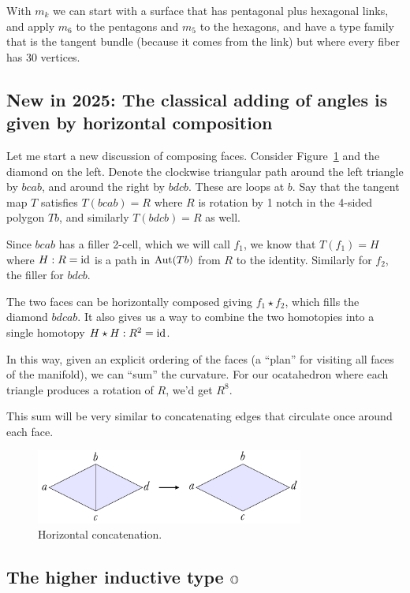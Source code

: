 With \( m_k \) we can start with a surface that has pentagonal plus hexagonal links, and apply \( m_6 \) to the pentagons and \( m_5 \) to the hexagons, and have a type family that is the tangent bundle (because it comes from the link) but where every fiber has 30 vertices.

\subsection{New in 2025: The classical adding of angles is given by horizontal composition}
Let me start a new discussion of composing faces. Consider Figure~\ref{fig:horiz_concat} and the diamond on the left. Denote the clockwise triangular path around the left triangle by \( bcab \), and around the right by \( bdcb \). These are loops at \( b \). Say that the tangent map \( T \) satisfies \( T(bcab)=R \) where \( R \) is rotation by 1 notch in the 4-sided polygon \( Tb \), and similarly \( T(bdcb)=R \) as well. 

Since \( bcab \) has a filler 2-cell, which we will call \( f_1 \), we know that \( T(f_1)=H \) where \( H:R=\text{id} \) is a path in \( \operatorname{Aut}(Tb) \) from \( R \) to the identity. Similarly for \( f_2 \), the filler for \( bdcb \). 

The two faces can be horizontally composed giving \( f_1\star f_2 \), which fills the diamond \( bdcab \). It also gives us a way to combine the two homotopies into a single homotopy \( H\star H:R^2=\text{id} \). 

In this way, given an explicit ordering of the faces (a ``plan'' for visiting all faces of the manifold), we can ``sum'' the curvature. For our ocatahedron where each triangle produces a rotation of \( R \), we'd get \( R^8 \).

This sum will be very similar to concatenating edges that circulate once around each face.

\begin{figure}[htbp]
\centering
\includegraphics[width=250pt]{concat.pdf}
\caption{Horizontal concatenation.}
\label{fig:horiz_concat}
\end{figure}




\subsection{\texorpdfstring{The higher inductive type \( \mathbb{O} \)}{The higher inductive type O}}

